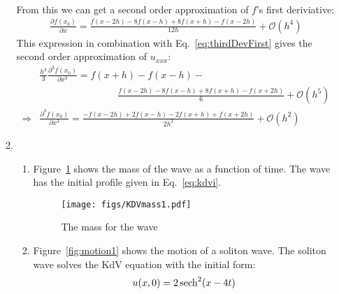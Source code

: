 \documentclass[12pt,a4]{article}
\begin{document}
\begin{enumerate}
\begin{enumerate}
\begin{align*}
        \end{align*}
        From this we can get a second order approximation of $f$'s first deriviative:
        \begin{align*}
          \frac{\partial f(x_0)}{\partial x} = \frac{f(x - 2 h)- 8 f(x - h) + 8 f(x + h) - f(x - 2 h)}{12 h} + \mathscr{O}(h^4) %
        \end{align*}
        This expression in combination with Eq.~\ref{eq:thirdDevFirst} gives the second order approximation of $u_{xxx}$:
        \begin{align*}
                      & \frac{h^3}{3} \frac{\partial^3 f(x_0)}{\partial x^3} = f(x + h) - f(x - h) - \\
                      & \qquad \qquad \qquad \qquad \frac{f(x - 2 h)- 8 f(x - h) + 8 f(x + h) - f(x + 2 h)}{6} + \mathscr{O}(h^5)\\ %
          \Rightarrow & \frac{\partial^3 f(x_0)}{\partial x^3} = \frac{- f(x - 2 h) + 2 f(x - h) - 2 f(x + h) + f(x +  2 h)}{2 h^3} + \mathscr{O}(h^2) %
        \end{align*}
      \item
        \begin{enumerate}
          \item
            Figure~\ref{fig:KDVmass1} shows the mass of the wave as a function of time.
            The wave has the initial profile given in Eq.~\ref{eq:kdvi}.
            \begin{figure}[H]
              \centering
              \texttt{[image: figs/KDVmass1.pdf]}
              \caption{The mass for the wave}
              \label{fig:KDVmass1}
            \end{figure}
          \item
            Figure~\ref{fig:motion1} shows the motion of a  soliton wave.
            The soliton wave solves the KdV equation with the initial form:
            \begin{equation}
              u(x, 0) = 2 \sech ^ 2 (x - 4t)

\end{equation}
\end{enumerate}
\end{enumerate}
\end{enumerate}
\end{document}
